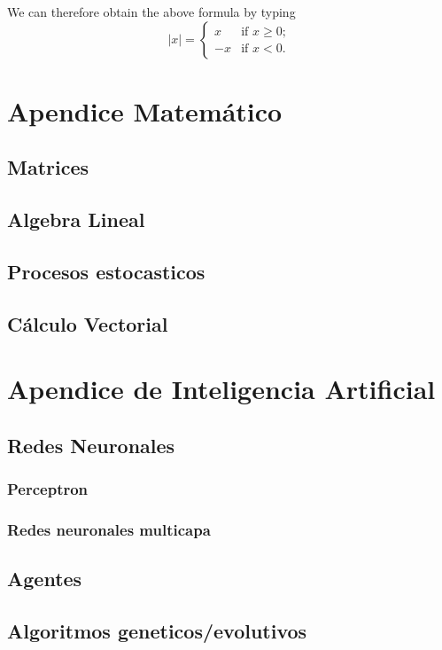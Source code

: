             
        We can therefore obtain the above formula by typing
        \[ |x| = \left\{ \begin{array}{ll}
                 x & \mbox{if $x \geq 0$};\\
                -x & \mbox{if $x < 0$}.\end{array} \right. \]


\chapter{Apendice Matemático}
    \section{Matrices}
    \section{Algebra Lineal}
    \section{Procesos estocasticos}
    \section{Cálculo Vectorial}
    
\chapter{Apendice de Inteligencia Artificial}
    \section{Redes Neuronales}
        \subsection{Perceptron}
        \subsection{Redes neuronales multicapa}
    \section{Agentes}
    \section{Algoritmos geneticos/evolutivos}
